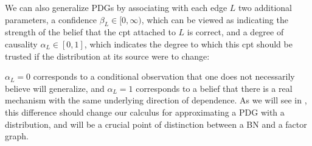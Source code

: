 \documentclass{article}
\newcommand{\Ed}{\mathcal E}
\numberwithin{equation}{section}
\begin{document}
	We can also generalize PDGs by associating with each edge $L$
        two additional parameters, a confidence $\beta_L \in [0,
          \infty)$, which can be viewed as indicating the strength of
          the belief that the cpt attached to $L$ is correct, and a
          degree of causality $\alpha_L \in [0,1]$, which indicates
          the degree to which this cpt should be trusted if the
          distribution at its source were to change: 
          
	$\alpha_L = 0$ corresponds to a conditional observation that
          one does not necessarily believe will generalize, and
          $\alpha_L = 1$ corresponds to a belief that there is a real
          mechanism with the same underlying direction of dependence.  
	As we will see in , this difference
        should change our calculus for approximating a PDG with a
        distribution, and will be a crucial point of distinction
        between a BN and a factor graph. 
\end{document}
